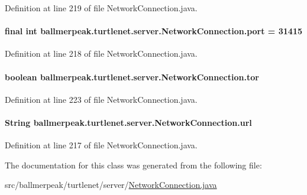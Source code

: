 Definition at line 219 of file Network\-Connection.\-java.

\hypertarget{classballmerpeak_1_1turtlenet_1_1server_1_1NetworkConnection_aa9ff41ab125a57c5e8465a2b3a6da971}{
\paragraph[{port}]{\setlength{\rightskip}{0pt plus 5cm}final int ballmerpeak.\-turtlenet.\-server.\-Network\-Connection.\-port = 31415\hspace{0.3cm}{\ttfamily [private]}}}\label{classballmerpeak_1_1turtlenet_1_1server_1_1NetworkConnection_aa9ff41ab125a57c5e8465a2b3a6da971}


Definition at line 218 of file Network\-Connection.\-java.

\hypertarget{classballmerpeak_1_1turtlenet_1_1server_1_1NetworkConnection_a6ffbe477a10b675006dbcc18dbf72909}{
\paragraph[{tor}]{\setlength{\rightskip}{0pt plus 5cm}boolean ballmerpeak.\-turtlenet.\-server.\-Network\-Connection.\-tor\hspace{0.3cm}{\ttfamily [private]}}}\label{classballmerpeak_1_1turtlenet_1_1server_1_1NetworkConnection_a6ffbe477a10b675006dbcc18dbf72909}


Definition at line 223 of file Network\-Connection.\-java.

\hypertarget{classballmerpeak_1_1turtlenet_1_1server_1_1NetworkConnection_a4586970fdb2b8223360db3464bda5526}{
\paragraph[{url}]{\setlength{\rightskip}{0pt plus 5cm}String ballmerpeak.\-turtlenet.\-server.\-Network\-Connection.\-url\hspace{0.3cm}{\ttfamily [private]}}}\label{classballmerpeak_1_1turtlenet_1_1server_1_1NetworkConnection_a4586970fdb2b8223360db3464bda5526}


Definition at line 217 of file Network\-Connection.\-java.



The documentation for this class was generated from the following file\-:\begin{DoxyCompactItemize}
\item 
src/ballmerpeak/turtlenet/server/\hyperlink{NetworkConnection_8java}{Network\-Connection.\-java}\end{DoxyCompactItemize}
